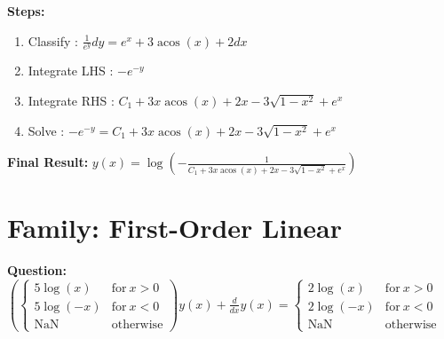\documentclass{article}
\begin{document}
\textbf{Steps:}
\begin{enumerate}
\item Classify :  $\frac{1}{e^{y}} dy = e^{x} + 3 \operatorname{acos}{\left(x \right)} + 2 dx$
\item Integrate LHS :  $- e^{- y}$
\item Integrate RHS :  $C_{1} + 3 x \operatorname{acos}{\left(x \right)} + 2 x - 3 \sqrt{1 - x^{2}} + e^{x}$
\item Solve :  $- e^{- y} = C_{1} + 3 x \operatorname{acos}{\left(x \right)} + 2 x - 3 \sqrt{1 - x^{2}} + e^{x}$
\end{enumerate}
\textbf{Final Result:} $y{\left(x \right)} = \log{\left(- \frac{1}{C_{1} + 3 x \operatorname{acos}{\left(x \right)} + 2 x - 3 \sqrt{1 - x^{2}} + e^{x}} \right)}$

\section*{Family: First-Order Linear}
\textbf{Question:} $\left(\begin{cases} 5 \log{\left(x \right)} & \text{for}\: x > 0 \\5 \log{\left(- x \right)} & \text{for}\: x < 0 \\\text{NaN} & \text{otherwise} \end{cases}\right) y{\left(x \right)} + \frac{d}{d x} y{\left(x \right)} = \begin{cases} 2 \log{\left(x \right)} & \text{for}\: x > 0 \\2 \log{\left(- x \right)} & \text{for}\: x < 0 \\\text{NaN} & \text{otherwise} \end{cases}$
\end{document}
